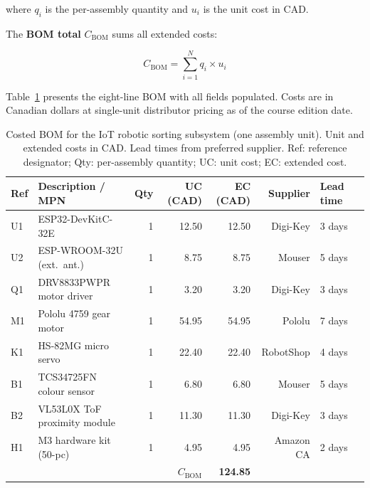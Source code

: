 where $q_i$ is the per-assembly quantity and $u_i$ is the unit cost in CAD.

The \textbf{BOM total} $C_{\text{BOM}}$ sums all extended costs:

\begin{equation}\label{eq:ch11-bom-total}
  C_{\text{BOM}} = \sum_{i=1}^{N} q_i \times u_i
\end{equation}

Table~\ref{tab:ch11-bom} presents the eight-line BOM with all fields populated.
Costs are in Canadian dollars at single-unit distributor pricing as of the
course edition date.

\begin{table}[htbp]
  \centering
  \caption{Costed BOM for the IoT robotic sorting subsystem (one assembly unit).
           Unit and extended costs in CAD.
           Lead times from preferred supplier.
           Ref: reference designator; Qty: per-assembly quantity;
           UC: unit cost; EC: extended cost.}
  \label{tab:ch11-bom}
  \small
  \begin{tabular}{llrrrrp{2.8cm}r}
    \toprule
    \textbf{Ref} & \textbf{Description / MPN} & \textbf{Qty} &
    \textbf{UC (CAD)} & \textbf{EC (CAD)} & \textbf{Supplier} &
    \textbf{Lead time} \\
    \midrule
    U1 & ESP32-DevKitC-32E                & 1 & 12.50 &  12.50 & Digi-Key  & 3 days \\
    U2 & ESP-WROOM-32U (ext.\ ant.)       & 1 &  8.75 &   8.75 & Mouser    & 5 days \\
    Q1 & DRV8833PWPR motor driver         & 1 &  3.20 &   3.20 & Digi-Key  & 3 days \\
    M1 & Pololu 4759 gear motor           & 1 & 54.95 &  54.95 & Pololu    & 7 days \\
    K1 & HS-82MG micro servo              & 1 & 22.40 &  22.40 & RobotShop & 4 days \\
    B1 & TCS34725FN colour sensor         & 1 &  6.80 &   6.80 & Mouser    & 5 days \\
    B2 & VL53L0X ToF proximity module     & 1 & 11.30 &  11.30 & Digi-Key  & 3 days \\
    H1 & M3 hardware kit (50-pc)          & 1 &  4.95 &   4.95 & Amazon CA & 2 days \\
    \midrule
    \multicolumn{4}{r}{\textbf{$C_{\text{BOM}}$}} & \textbf{124.85} & & \\
    \bottomrule
  \end{tabular}
\end{table}


